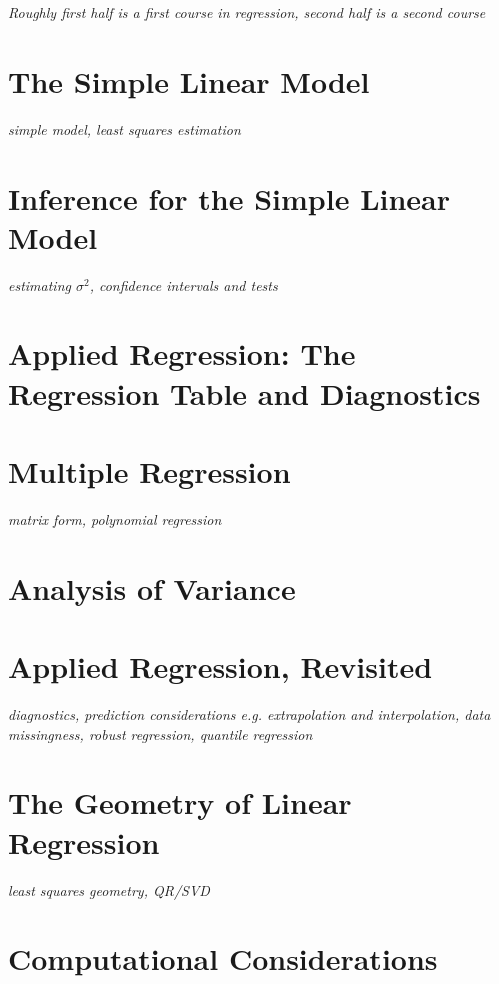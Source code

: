 \documentclass[../../../main.tex]{subfiles}
\begin{document}

\textit{Roughly first half is a first course in regression, second half is a second course}

\section{The Simple Linear Model}
\textit{simple model, least squares estimation}

\section{Inference for the Simple Linear Model}
\textit{estimating $\sigma^2$, confidence intervals and tests}

\section{Applied Regression: The Regression Table and Diagnostics}

\section{Multiple Regression}
\textit{matrix form, polynomial regression}

\section{Analysis of Variance}

\section{Applied Regression, Revisited}
\textit{diagnostics, prediction considerations e.g. extrapolation and interpolation, data missingness, robust regression, quantile regression}

\section{The Geometry of Linear Regression}
\textit{least squares geometry, QR/SVD}

\section{Computational Considerations}
\end{document}
